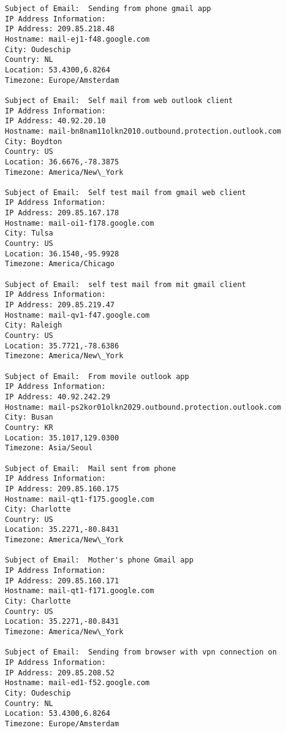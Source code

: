 \documentclass[11pt]{article}
\makeatletter
\newcommand{\boxspacing}{\kern\kvtcb@left@rule\kern\kvtcb@boxsep}
\newcommand{\prompt}[4]{
        {\ttfamily\llap{{\color{#2}[#3]:\hspace{3pt}#4}}\vspace{-\baselineskip}}
    }
\makeatother
\begin{document}
    \begin{Verbatim}[commandchars=\\\{\}]
Subject of Email:  Sending from phone gmail app
IP Address Information:
IP Address: 209.85.218.48
Hostname: mail-ej1-f48.google.com
City: Oudeschip
Country: NL
Location: 53.4300,6.8264
Timezone: Europe/Amsterdam

Subject of Email:  Self mail from web outlook client
IP Address Information:
IP Address: 40.92.20.10
Hostname: mail-bn8nam11olkn2010.outbound.protection.outlook.com
City: Boydton
Country: US
Location: 36.6676,-78.3875
Timezone: America/New\_York

Subject of Email:  Self test mail from gmail web client
IP Address Information:
IP Address: 209.85.167.178
Hostname: mail-oi1-f178.google.com
City: Tulsa
Country: US
Location: 36.1540,-95.9928
Timezone: America/Chicago

Subject of Email:  self test mail from mit gmail client
IP Address Information:
IP Address: 209.85.219.47
Hostname: mail-qv1-f47.google.com
City: Raleigh
Country: US
Location: 35.7721,-78.6386
Timezone: America/New\_York

Subject of Email:  From movile outlook app
IP Address Information:
IP Address: 40.92.242.29
Hostname: mail-ps2kor01olkn2029.outbound.protection.outlook.com
City: Busan
Country: KR
Location: 35.1017,129.0300
Timezone: Asia/Seoul

Subject of Email:  Mail sent from phone
IP Address Information:
IP Address: 209.85.160.175
Hostname: mail-qt1-f175.google.com
City: Charlotte
Country: US
Location: 35.2271,-80.8431
Timezone: America/New\_York

Subject of Email:  Mother's phone Gmail app
IP Address Information:
IP Address: 209.85.160.171
Hostname: mail-qt1-f171.google.com
City: Charlotte
Country: US
Location: 35.2271,-80.8431
Timezone: America/New\_York

Subject of Email:  Sending from browser with vpn connection on
IP Address Information:
IP Address: 209.85.208.52
Hostname: mail-ed1-f52.google.com
City: Oudeschip
Country: NL
Location: 53.4300,6.8264
Timezone: Europe/Amsterdam

    \end{Verbatim}

    \begin{tcolorbox}[breakable, size=fbox, boxrule=1pt, pad at break*=1mm,colback=cellbackground, colframe=cellborder]
\prompt{In}{incolor}{ }{\boxspacing}
\begin{Verbatim}[commandchars=\\\{\}]

\end{Verbatim}
\end{tcolorbox}


    
    
    
\end{document}
